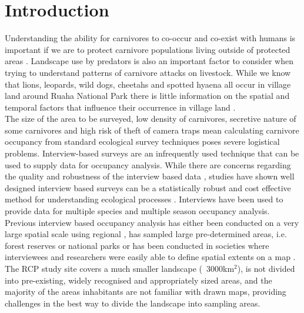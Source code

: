 \section{Introduction}

Understanding the ability for carnivores to co-occur and co-exist with humans is important if we are to protect carnivore populations living outside of protected areas \citep{woodroffe2005,Dickman_2014,Ripple_2014}. Landscape use by predators is also an important factor to consider when trying to understand patterns of carnivore attacks on livestock. While we know that lions, leopards, wild dogs, cheetahs and spotted hyaena all occur in village land around Ruaha National Park \cite{Abade_2014,dickman2008} there is little information on the spatial and temporal factors that influence their occurrence in village land \cite{Abade2014a}.\\ 

The size of the area to be surveyed, low density of carnivores, secretive nature of some carnivores and high risk of theft of camera traps mean calculating carnivore occupancy from standard ecological survey techniques poses severe logistical problems. Interview-based surveys are an infrequently used technique that can be used to supply data for occupancy analysis. While there are concerns regarding the quality and robustness of the interview based data \cite{Sheil_2004}, studies have shown well designed interview based surveys can be a statistically robust and cost effective method for understanding ecological processes \cite{Meijaard_2011,Polfus_2013,Gros_1996}. Interviews have been used to provide data for multiple species \cite{Karanth_2009,Zeller_2011} and multiple season \cite{Pillay_2011} occupancy analysis.\\

Previous interview based occupancy analysis has either been conducted on a very large spatial scale using regional \cite{Karanth_2009}, has sampled large pre-determined areas, i.e. forest reserves or national parks \cite{Pillay_2011,Pillay_2013,brittain2013} or has been conducted in societies where interviewees and researchers were easily able to define spatial extents on a map \cite{Taubmann_2015,Zeller_2011,Petracca_2013}. The RCP study site covers a much smaller landscape (~3000km$^2$), is not divided into pre-existing, widely recognised and appropriately sized areas, and the majority of the areas inhabitants are not familiar with drawn maps, providing challenges in the best way to divide the landscape into sampling areas.\\

